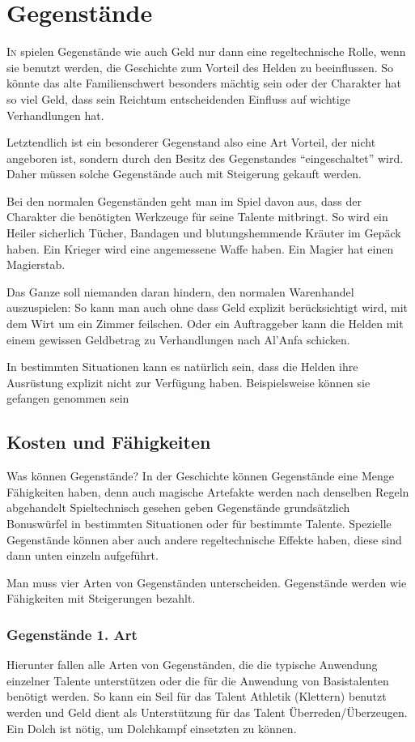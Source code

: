 \chapter{Gegenstände}\label{Ch:Gegenstaende}

\BN
\lettrine{I}{n} \StoryDSA spielen Gegenstände wie auch Geld nur dann eine regeltechnische Rolle, wenn sie benutzt werden, die Geschichte zum Vorteil des Helden zu beeinflussen. So könnte das alte Familienschwert besonders mächtig sein oder der Charakter hat so viel Geld, dass sein Reichtum entscheidenden Einfluss auf wichtige Verhandlungen hat.

Letztendlich ist ein besonderer Gegenstand also eine Art Vorteil, der nicht angeboren ist, sondern durch den Besitz des Gegenstandes ``eingeschaltet'' wird. Daher müssen solche Gegenstände auch mit Steigerung gekauft werden.

Bei den normalen Gegenständen geht man im Spiel davon aus, dass der Charakter die benötigten Werkzeuge für seine Talente mitbringt. So wird ein Heiler sicherlich Tücher, Bandagen und blutungshemmende Kräuter im Gepäck haben. Ein Krieger wird eine angemessene Waffe haben. Ein Magier hat einen Magierstab.

Das Ganze soll niemanden daran hindern, den normalen Warenhandel auszuspielen: So kann man auch ohne dass Geld explizit berücksichtigt wird, mit dem Wirt um ein Zimmer feilschen. Oder ein Auftraggeber kann die Helden mit einem gewissen Geldbetrag zu Verhandlungen nach Al'Anfa schicken.

In bestimmten Situationen kann es natürlich sein, dass die Helden ihre Ausrüstung explizit nicht zur Verfügung haben. Beispielsweise können sie gefangen genommen sein

\section{Kosten und Fähigkeiten}
Was können Gegenstände? In der Geschichte können Gegenstände eine Menge Fähigkeiten haben, denn auch magische Artefakte werden nach denselben Regeln abgehandelt  Spieltechnisch gesehen geben Gegenstände grundsätzlich Bonuswürfel in bestimmten Situationen oder für bestimmte Talente. Spezielle Gegenstände können aber auch andere regeltechnische Effekte haben, diese sind dann unten einzeln aufgeführt.

Man muss vier Arten von Gegenständen unterscheiden. Gegenstände werden wie Fähigkeiten mit Steigerungen bezahlt.

\subsection{Gegenstände 1. Art}
Hierunter fallen alle Arten von Gegenständen, die die typische Anwendung einzelner Talente unterstützen oder die für die Anwendung von Basistalenten benötigt werden. So kann ein Seil für das Talent Athletik (Klettern) benutzt werden und Geld dient als Unterstützung für das Talent Überreden/Überzeugen. Ein Dolch ist nötig, um Dolchkampf einsetzten zu können.

